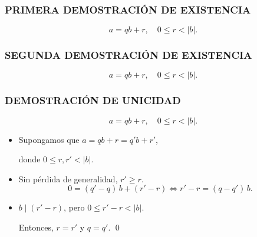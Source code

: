\begin{frame}
  \frametitle{PRIMERA DEMOSTRACIÓN DE EXISTENCIA}

  \begin{framed}
      \[ a = qb + r,
        \quad
        0 \le r < |b|. \]
    \end{framed}


  \vspace{\fill}
\end{frame}

\begin{frame}
  \frametitle{SEGUNDA DEMOSTRACIÓN DE EXISTENCIA}

  \begin{framed}
    \[ a = qb + r,
      \quad
      0 \le r < |b|. \]
  \end{framed}




  \vspace{\fill}
\end{frame}

\begin{frame}
  \frametitle{DEMOSTRACIÓN DE UNICIDAD}

  \begin{framed}
    \[ a = qb + r,
      \quad
      0 \le r < |b|. \]
  \end{framed}

  \begin{itemize}
  \item<2-> Supongamos que
    $a = qb + r = q' b + r'$,

    donde $0 \le r, r' < |b|$.

  \item<3-> Sin pérdida de generalidad, $r' \ge r$.
    $$0 = (q'-q)\,b + (r'-r) \iff r' - r = (q-q')\,b.$$

  \item<4-> $b \mid (r' - r)$, pero $0 \le r' - r < |b|$.

    Entonces, $r = r'$ y $q = q'$. \qed
  \end{itemize}

  \vspace{\fill}
\end{frame}

